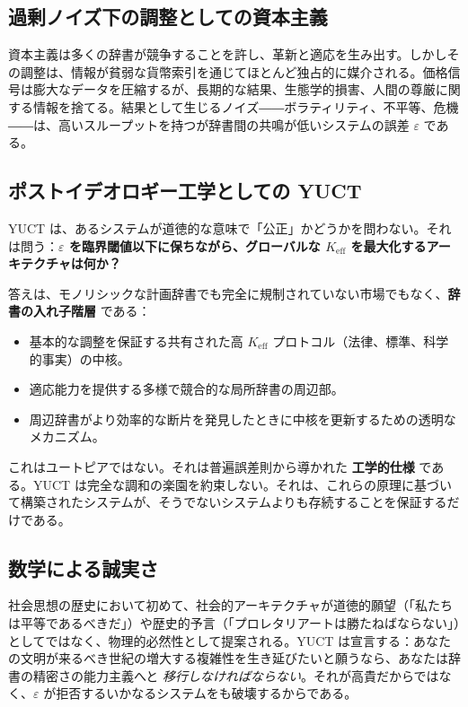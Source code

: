 \documentclass[12pt,a4paper]{article}
\newcommand{\Keff}{K_{\mathrm{eff}}}
\begin{document}
	\subsection{過剰ノイズ下の調整としての資本主義}
	
	資本主義は多くの辞書が競争することを許し、革新と適応を生み出す。しかしその調整は、情報が貧弱な貨幣索引を通じてほとんど独占的に媒介される。価格信号は膨大なデータを圧縮するが、長期的な結果、生態学的損害、人間の尊厳に関する情報を捨てる。結果として生じるノイズ――ボラティリティ、不平等、危機――は、高いスループットを持つが辞書間の共鳴が低いシステムの誤差 \(\varepsilon\) である。
	
	\subsection{ポストイデオロギー工学としての YUCT}
	
	YUCT は、あるシステムが道徳的な意味で「公正」かどうかを問わない。それは問う：\textbf{\(\varepsilon\) を臨界閾値以下に保ちながら、グローバルな \(K_{\mathrm{eff}}\) を最大化するアーキテクチャは何か？}
	
	答えは、モノリシックな計画辞書でも完全に規制されていない市場でもなく、\textbf{辞書の入れ子階層} である：
	\begin{itemize}[leftmargin=*]
		\item 基本的な調整を保証する共有された高 \(\Keff\) プロトコル（法律、標準、科学的事実）の中核。
		\item 適応能力を提供する多様で競合的な局所辞書の周辺部。
		\item 周辺辞書がより効率的な断片を発見したときに中核を更新するための透明なメカニズム。
	\end{itemize}
	
	これはユートピアではない。それは普遍誤差則から導かれた \textbf{工学的仕様} である。YUCT は完全な調和の楽園を約束しない。それは、これらの原理に基づいて構築されたシステムが、そうでないシステムよりも存続することを保証するだけである。
	
	\subsection{数学による誠実さ}
	
	社会思想の歴史において初めて、社会的アーキテクチャが道徳的願望（「私たちは平等であるべきだ」）や歴史的予言（「プロレタリアートは勝たねばならない」）としてではなく、物理的必然性として提案される。YUCT は宣言する：あなたの文明が来るべき世紀の増大する複雑性を生き延びたいと願うなら、あなたは辞書の精密さの能力主義へと \emph{移行しなければならない}。それが高貴だからではなく、\(\varepsilon\) が拒否するいかなるシステムをも破壊するからである。
	
\end{document}

